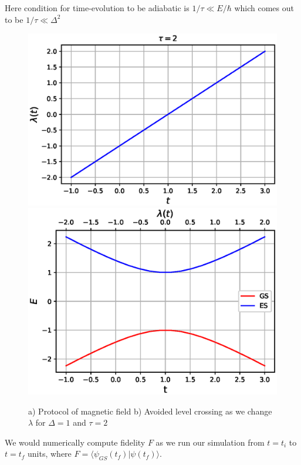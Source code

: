 \documentclass[11pt,a4paper]{article}
\begin{document}
Here condition for time-evolution to be adiabatic is $1/ \tau \ll E/ \hbar $ which comes out to be $1/ \tau \ll \Delta^2 $
\begin{figure}[!ht]
\begin{center}
 \includegraphics[scale=0.5]{pics/lambda_LZ.eps} 
\includegraphics[scale=0.5]{pics/energy_LZ.eps} 
\caption{a) Protocol of magnetic field b) Avoided level crossing as we change $\lambda$ for $\Delta=1$ and $\tau=2$ }
\label{ev_lz}
\end{center}
\end{figure}

We would numerically compute fidelity $F$ as we run our simulation  from $t=t_i$ to $t=t_f$ units, where $F= \langle  \psi_{GS} (t_f)| \psi(t_f) \rangle$.
\end{document}
